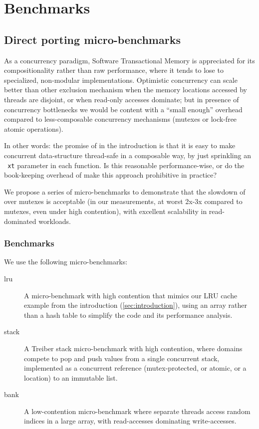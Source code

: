 \section{Benchmarks}
\label{sec:benchmarks}

\def\benchmarkWidth{%
  .8\textwidth%
}

\subsection{Direct porting micro-benchmarks}


As a concurrency paradigm, Software Transactional Memory is
appreciated for its compositionality rather than raw performance,
where it tends to lose to specialized, non-modular
implementations. Optimistic concurrency can scale better than other
exclusion mechanism when the memory locations accessed by threads are
disjoint, or when read-only accesses dominate; but in presence of
concurrency bottlenecks we would be content with a ``small enough''
overhead compared to less-composable concurrency mechanisms
(mutexes or lock-free atomic operations).

In other words: the promise of \Kcas in the introduction is that it is
easy to make concurrent data-structure thread-safe in a composable
way, by just sprinkling an \texttt{~xt} parameter in each function. Is
this reasonable performance-wise, or do the book-keeping overhead of
\Kcas make this approach prohibitive in practice?

We propose a series of micro-benchmarks to demonstrate that the
slowdown of \Kcas over mutexes is acceptable (in our measurements, at
worst 2x-3x compared to mutexes, even under high contention), with
excellent scalability in read-dominated workloads.

\subsubsection{Benchmarks}

We use the following micro-benchmarks:

\begin{description}
\item[lru] A micro-benchmark with high contention that mimics our
  LRU cache example from the introduction (\cref{sec:introduction}),
  using an array rather than a hash table to simplify the code and its
  performance analysis.
\item[stack] A Treiber stack micro-benchmark with high contention,
  where domains compete to pop and push values from a single
  concurrent stack, implemented as a concurrent reference
  (mutex-protected, or atomic, or a \Kcas location) to an immutable
  list.
\item[bank] A low-contention micro-benchmark where separate threads
  access random indices in a large array, with read-accesses
  dominating write-accesses.
\end{description}

